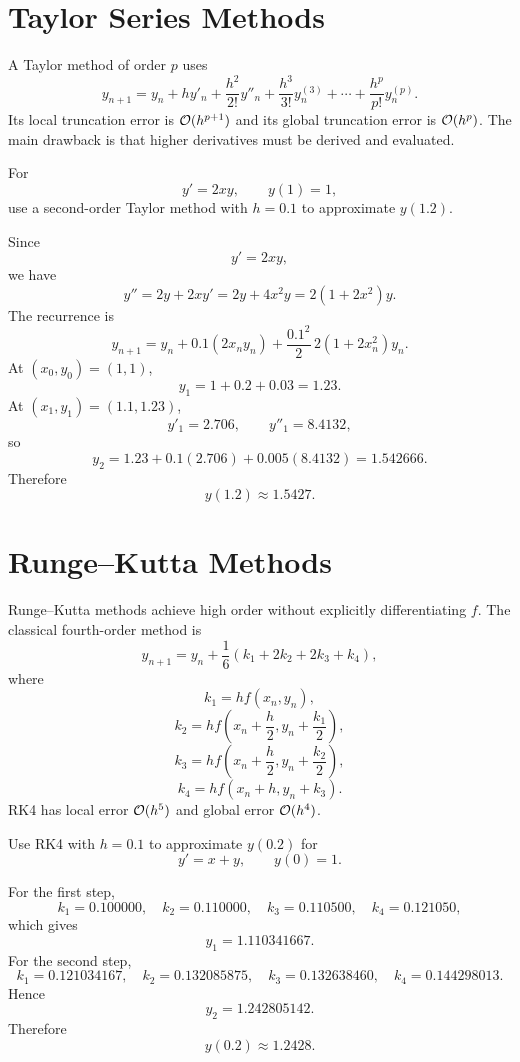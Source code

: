 \section{Taylor Series Methods}

A Taylor method of order $p$ uses
\[
 y_{n+1}=y_n+hy'_n+\frac{h^2}{2!}y''_n+\frac{h^3}{3!}y^{(3)}_n+
 \cdots+\frac{h^p}{p!}y_n^{(p)}.
\]
Its local truncation error is $\mathcal O(h^{p+1})$ and its global truncation error is $\mathcal O(h^p)$.  The main drawback is that higher derivatives must be derived and evaluated.

\begin{example}
For
\[
 y'=2xy,
 \qquad y(1)=1,
\]
use a second-order Taylor method with $h=0.1$ to approximate $y(1.2)$.
\end{example}

\begin{solution}[5.0cm]
Since
\[
 y'=2xy,
\]
we have
\[
 y''=2y+2xy'=2y+4x^2y=2(1+2x^2)y.
\]
The recurrence is
\[
 y_{n+1}=y_n+0.1(2x_ny_n)
 +\frac{0.1^2}{2}\,2(1+2x_n^2)y_n.
\]
At $(x_0,y_0)=(1,1)$,
\[
 y_1=1+0.2+0.03=1.23.
\]
At $(x_1,y_1)=(1.1,1.23)$,
\[
 y'_1=2.706,
 \qquad y''_1=8.4132,
\]
so
\[
 y_2=1.23+0.1(2.706)+0.005(8.4132)
 =1.542666.
\]
Therefore
\[
 y(1.2)\approx1.5427.
\]
\end{solution}

\section{Runge--Kutta Methods}

Runge--Kutta methods achieve high order without explicitly differentiating $f$.  The classical fourth-order method is
\[
 y_{n+1}=y_n+\frac16(k_1+2k_2+2k_3+k_4),
\]
where
\[
 k_1=hf(x_n,y_n),
\]
\[
 k_2=hf\left(x_n+\frac h2,y_n+\frac{k_1}{2}\right),
\]
\[
 k_3=hf\left(x_n+\frac h2,y_n+\frac{k_2}{2}\right),
\]
\[
 k_4=hf(x_n+h,y_n+k_3).
\]
RK4 has local error $\mathcal O(h^5)$ and global error $\mathcal O(h^4)$.

\begin{example}
Use RK4 with $h=0.1$ to approximate $y(0.2)$ for
\[
 y'=x+y,
 \qquad y(0)=1.
\]
\end{example}

\begin{solution}[6.2cm]
For the first step,
\[
 k_1=0.100000,
 \quad k_2=0.110000,
 \quad k_3=0.110500,
 \quad k_4=0.121050,
\]
which gives
\[
 y_1=1.110341667.
\]
For the second step,
\[
 k_1=0.121034167,
 \quad k_2=0.132085875,
 \quad k_3=0.132638460,
 \quad k_4=0.144298013.
\]
Hence
\[
 y_2=1.242805142.
\]
Therefore
\[
 y(0.2)\approx1.2428.
\]
\end{solution}

